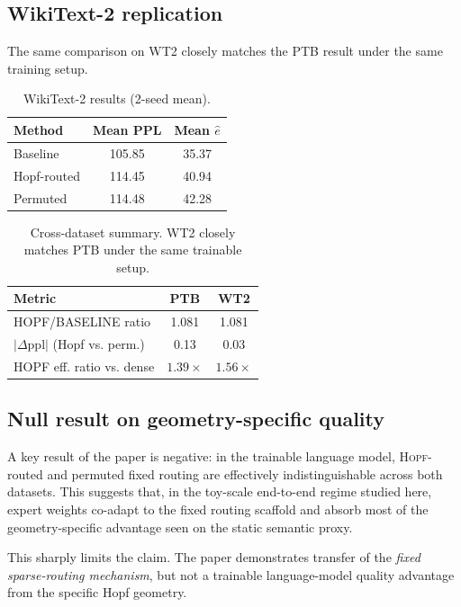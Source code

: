 \documentclass[10pt,conference]{IEEEtran}
\newcommand{\effb}{\hat e}
\newcommand{\hopf}{\textsc{Hopf}}
\begin{document}
\subsection{WikiText-2 replication}
The same comparison on WT2 closely matches the PTB result under the same training setup.

\begin{table}[t]
\centering
\caption{WikiText-2 results (2-seed mean).}
\label{tab:wt2}
\small
\begin{tabular}{lcc}
\toprule
Method & Mean PPL & Mean $\effb$ \\
\midrule
Baseline & 105.85 & 35.37 \\
Hopf-routed & 114.45 & 40.94 \\
Permuted & 114.48 & 42.28 \\
\bottomrule
\end{tabular}
\end{table}

\begin{table}[t]
\centering
\caption{Cross-dataset summary. WT2 closely matches PTB under the same trainable setup.}
\label{tab:crossdataset}
\small
\begin{tabular}{lcc}
\toprule
Metric & PTB & WT2 \\
\midrule
HOPF/BASELINE ratio & 1.081 & 1.081 \\
$|\Delta \mathrm{ppl}|$ (Hopf vs. perm.) & 0.13 & 0.03 \\
HOPF eff. ratio vs. dense & $1.39\times$ & $1.56\times$ \\
\bottomrule
\end{tabular}
\end{table}

\subsection{Null result on geometry-specific quality}
A key result of the paper is negative: in the trainable language model, \hopf{}-routed and permuted fixed routing are effectively indistinguishable across both datasets. This suggests that, in the toy-scale end-to-end regime studied here, expert weights co-adapt to the fixed routing scaffold and absorb most of the geometry-specific advantage seen on the static semantic proxy.

This sharply limits the claim. The paper demonstrates transfer of the \emph{fixed sparse-routing mechanism}, but not a trainable language-model quality advantage from the specific Hopf geometry.
\end{document}
